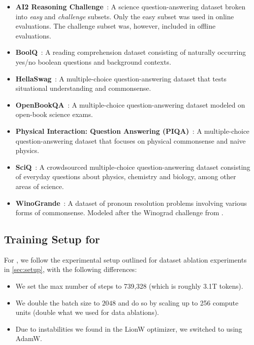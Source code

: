 \begin{itemize}[leftmargin=1em]
    \item \textbf{AI2 Reasoning Challenge}~\citep{arc}: A science question-answering dataset broken into \emph{easy} and \emph{challenge} subsets. Only the easy subset was used in online evaluations. The challenge subset was, however,  included in offline evaluations.
    \item \textbf{BoolQ}~\citep{clark2019boolq}: A reading comprehension dataset consisting of naturally occurring yes/no boolean questions and background contexts. 
    \item \textbf{HellaSwag}~\citep{zellers2019hellaswag}: A multiple-choice question-answering dataset that tests situational understanding and commonsense. 
    \item \textbf{OpenBookQA}~\citep{openbookQA}: A multiple-choice question-answering dataset modeled on open-book science exams.  
    \item \textbf{Physical Interaction: Question Answering (PIQA)}~\citep{piqa}: A multiple-choice question-answering dataset that focuses on physical commonsense and naive physics.  
    \item \textbf{SciQ}~\citep{sciq}: A crowdsourced multiple-choice question-answering dataset consisting of everyday questions about physics, chemistry and biology, among other areas of science.   
    \item \textbf{WinoGrande}~\citep{winogrande}: A dataset of pronoun resolution problems involving various forms of commonsense. Modeled after the Winograd challenge from \citet{wsc}.  
\end{itemize}

\subsection{Training Setup for \OlmoTiny}
\label{appendix:training-olmo-1b}

For \OlmoTiny, we follow the experimental setup outlined for dataset ablation experiments in \autoref{sec:setup}, with the following differences:

\begin{itemize}[leftmargin=1em]
    \item We set the max number of steps to 739,328 (which is roughly 3.1T tokens).
    \item We double the batch size to $2048$ and do so by scaling up to 256 compute units (double what we used for data ablations).
    \item Due to instabilities we found in the LionW optimizer, we switched to using AdamW.
\end{itemize}
